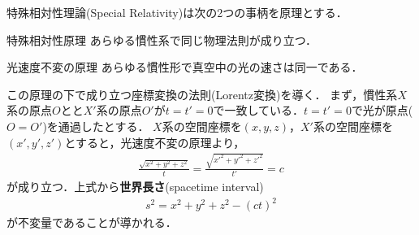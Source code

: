\documentclass{report}
\begin{document}
  特殊相対性理論(Special Relativity)は次の2つの事柄を原理とする．
  \begin{itembox}[l]{特殊相対性原理}
    あらゆる慣性系で同じ物理法則が成り立つ．
  \end{itembox}

  \begin{itembox}[l]{光速度不変の原理}
    あらゆる慣性形で真空中の光の速さは同一である．
  \end{itembox}

  この原理の下で成り立つ座標変換の法則(Lorentz変換)を導く．
  まず，慣性系$X$系の原点$O$とと$X'$系の原点$O'$が$t=t'=0$で一致している．$t=t'=0$で光が原点($O=O'$)を通過したとする．
  $X$系の空間座標を$(x,y,z)$，$X'$系の空間座標を$(x',y',z')$とすると，光速度不変の原理より，
  \begin{align}
    \frac{\sqrt{x^2 + y^2 + z^2}}{t} = \frac{\sqrt{x'^2 + y'^2 + z'^2}}{t'} = c
  \end{align}
  が成り立つ．上式から\textbf{世界長さ}(spacetime interval)
  \begin{align}
    s^2 = x^2 + y^2 + z^2 - (ct)^2
  \end{align}
  が不変量であることが導かれる．
\end{document}
